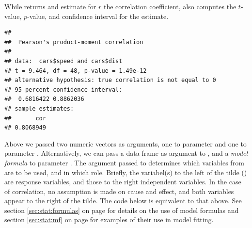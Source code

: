 \documentclass[krantz2]{krantz}\usepackage{knitr}
\begin{document}
While  returns and estimate for $r$ the correlation coefficient,  also computes the $t$-value, $p$-value, and confidence interval for the estimate.

\begin{knitrout}\footnotesize
{}\color{fgcolor}\begin{kframe}
\begin{alltt}
\hlstd{(} \hlopt{$}  \hlopt{$}
\end{alltt}
\begin{verbatim}
## 
## 	Pearson's product-moment correlation
## 
## data:  cars$speed and cars$dist
## t = 9.464, df = 48, p-value = 1.49e-12
## alternative hypothesis: true correlation is not equal to 0
## 95 percent confidence interval:
##  0.6816422 0.8862036
## sample estimates:
##       cor 
## 0.8068949
\end{verbatim}
\end{kframe}
\end{knitrout}

Above we passed two numeric vectors as arguments, one to parameter  and one to parameter . Alternatively, we can pass a data frame as argument to , and a \emph{model formula} to parameter . The argument passed to  determines which variables from  are to be used, and in which role. Briefly, the variabel(s) to the left of the tilde (\code{~}) are response variables, and those to the right independent variables. In the case of correlation, no assumption is made on cause and effect, and both variables appear to the right of the tilde. The code below is equivalent to that above. See section \ref{sec:stat:formulas} on page \pageref{sec:stat:formulas} for details on the use of model formulas and section \ref{sec:stat:mf} on page \pageref{sec:stat:mf} for examples of their use in model fitting.

\begin{knitrout}\footnotesize
{}\color{fgcolor}\begin{kframe}
\begin{alltt}
\hlstd{(} \hlstd{=} \hlopt{~}  \hlopt{+}   
\end{alltt}
\end{kframe}
\end{knitrout}
\end{document}
